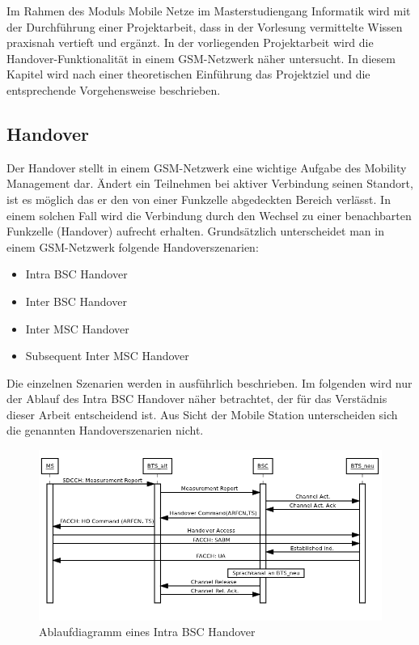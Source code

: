 
Im Rahmen des Moduls Mobile Netze im Masterstudiengang Informatik wird mit der Durchführung einer Projektarbeit, dass in der Vorlesung vermittelte Wissen praxisnah vertieft und  ergänzt. In der vorliegenden Projektarbeit wird die Handover-Funktionalität in einem GSM-Netzwerk näher untersucht. In diesem Kapitel wird nach einer theoretischen Einführung das Projektziel und die entsprechende Vorgehensweise beschrieben.

\subsection{Handover}\label{sec:handover}

Der Handover stellt in einem GSM-Netzwerk eine wichtige Aufgabe des Mobility Management dar. Ändert ein Teilnehmen bei aktiver Verbindung seinen Standort, ist es möglich das er den von einer Funkzelle abgedeckten Bereich verlässt. In einem solchen Fall wird die Verbindung durch den Wechsel zu einer benachbarten Funkzelle (Handover) aufrecht erhalten. Grundsätzlich unterscheidet man in einem GSM-Netzwerk folgende Handoverszenarien:

\begin{itemize}
 \item Intra BSC Handover
 \item Inter BSC Handover
 \item Inter MSC Handover
 \item Subsequent Inter MSC Handover
\end{itemize}

Die einzelnen Szenarien werden in \cite{bib:grundkursmks} ausführlich beschrieben. Im folgenden wird nur der Ablauf des Intra BSC Handover näher betrachtet, der für das Verstädnis dieser Arbeit entscheidend ist. Aus Sicht der Mobile Station unterscheiden sich die genannten Handoverszenarien nicht.

\begin{figure}[h!]
  \centering
  \includegraphics[width=\textwidth]{img/ablauf_handover}
  \caption{Ablaufdiagramm eines Intra BSC Handover}
  \label{fig:adhandover}
\end{figure}

